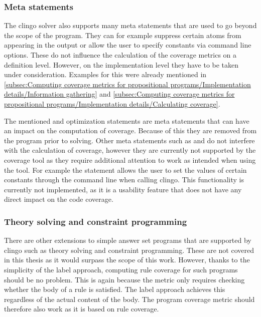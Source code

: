 \subsubsection{Meta statements}
\label{subsubsec:Coverage for further program classes/Language constructs/Meta statements}
The clingo solver also supports many meta statements that are used to go beyond the scope of the program. They can for example suppress certain atoms from appearing in the output or allow the user to specify constants via command line options. These do not influence the calculation of the coverage metrics on a definition level. However, on the implementation level they have to be taken under consideration. Examples for this were already mentioned in \cref{subsec:Computing coverage metrics for propositional programs/Implementation details/Information gathering} and \cref{subsec:Computing coverage metrics for propositional programs/Implementation details/Calculating coverage}. 

The mentioned  and optimization statements are meta statements that can have an impact on the computation of coverage. Because of this they are removed from the program prior to solving. Other meta statements such as  and  do not interfere with the calculation of coverage, however they are currently not supported by the coverage tool as they require additional attention to work as intended when using the tool. For example the  statement allows the user to set the values of certain constants through the command line when calling clingo. This functionality is currently not implemented, as it is a usability feature that does not have any direct impact on the code coverage.

\subsubsection{Theory solving and constraint programming}
\label{subsubsec:Coverage for further program classes/Language constructs/Theory solving and constraint programming}
There are other extensions to simple answer set programs that are supported by clingo such as theory solving and constraint programming. These are not covered in this thesis as it would surpass the scope of this work. However, thanks to the simplicity of the label approach, computing rule coverage for such programs should be no problem. This is again because the metric only requires checking whether the body of a rule is satisfied. The label approach achieves this regardless of the actual content of the body. The program coverage metric should therefore also work as it is based on rule coverage.


